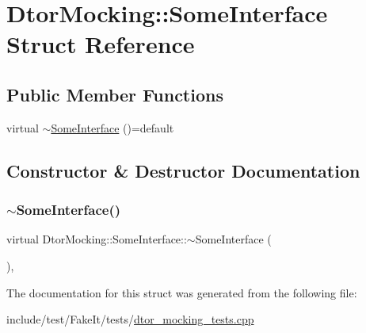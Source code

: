 \hypertarget{structDtorMocking_1_1SomeInterface}{}\section{Dtor\+Mocking\+::Some\+Interface Struct Reference}
\label{structDtorMocking_1_1SomeInterface}
\subsection*{Public Member Functions}
\begin{DoxyCompactItemize}
\item 
virtual \mbox{\hyperlink{structDtorMocking_1_1SomeInterface_ae2fddf744e46eff1d2fdc171bdf2b0a4}{$\sim$\+Some\+Interface}} ()=default
\end{DoxyCompactItemize}


\subsection{Constructor \& Destructor Documentation}
\mbox{\label{structDtorMocking_1_1SomeInterface_ae2fddf744e46eff1d2fdc171bdf2b0a4}} 
\subsubsection{\texorpdfstring{$\sim$SomeInterface()}{~SomeInterface()}}
{\footnotesize\ttfamily virtual Dtor\+Mocking\+::\+Some\+Interface\+::$\sim$\+Some\+Interface (\begin{DoxyParamCaption}{ }\end{DoxyParamCaption})\hspace{0.3cm}{\ttfamily [virtual]}, {\ttfamily [default]}}



The documentation for this struct was generated from the following file\+:\begin{DoxyCompactItemize}
\item 
include/test/\+Fake\+It/tests/\mbox{\hyperlink{dtor__mocking__tests_8cpp}{dtor\+\_\+mocking\+\_\+tests.\+cpp}}\end{DoxyCompactItemize}
